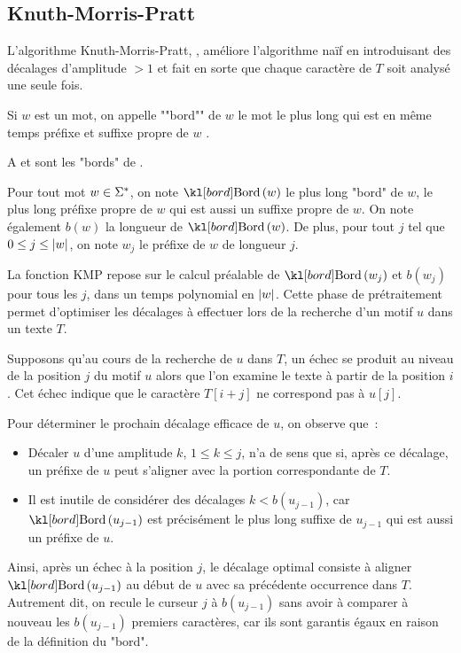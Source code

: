 \subsection{Knuth-Morris-Pratt}


L'algorithme Knuth-Morris-Pratt, \cite{kmp}, améliore l'algorithme naïf en introduisant des décalages d'amplitude
$> 1$ et fait en sorte que chaque caractère de $T$ soit analysé une seule fois.

\begin{definition}
	Si $w$ est un mot, on appelle ""bord"" de $w$ le mot le plus long qui est en même temps préfixe et suffixe propre de $w$ .
\end{definition}

\begin{exemple}
	\quotes A et   sont les "bords" de .
\end{exemple}


Pour tout mot $w \in \Sigma^{*}$, on note $\Bord w$ le plus long "bord" de $w$,
\cad le plus long préfixe propre de  $w$ qui est aussi un suffixe propre de $w$.
On note également $b(w)$ la longueur de $\Bord w$. De plus, pour tout $j$ tel que
$0 \leq j \leq |w| $, on note $w_j$ le préfixe de $w$ de longueur $j$.

La fonction KMP repose sur le calcul préalable de $\Bord{w_j}$ et  $b(w_j)$ pour tous les
$j$, dans un temps polynomial en $|w|$. Cette phase de prétraitement permet d’optimiser les décalages
à effectuer lors de la recherche d’un motif $u$ dans un texte $T$.

Supposons qu’au cours de la recherche de $u$ dans $T$, un échec se produit au niveau de la position $j$
du motif $u$ alors que l'on examine le texte à partir de la position $i$. Cet échec indique que le caractère
$T[i+j]$ ne correspond pas à $u[j]$.

Pour déterminer le prochain décalage efficace de $u$, on observe que :
\begin{itemize}
	\item Décaler $u$ d’une amplitude $k$, $1 \leq k \leq j$, n’a de sens que si, après ce décalage,
	      un préfixe de $u$ peut s’aligner avec la portion correspondante de $T$.
	\item Il est inutile de considérer des décalages $k < b(u_{j-1})$, car $\Bord{u_{j-1}}$
	      est précisément le plus long suffixe de $u_{j-1}$ qui est aussi un préfixe de $u$.
\end{itemize}

Ainsi, après un échec à la position $j$, le décalage optimal consiste à aligner $\Bord{u_{j-1}}$
au début de $u$ avec sa précédente occurrence dans $T$. Autrement dit, on recule le curseur
$j$ à $b(u_{j-1})$ sans avoir à comparer à nouveau les $b(u_{j-1})$ premiers caractères,
car ils sont garantis égaux en raison de la définition du "bord".

